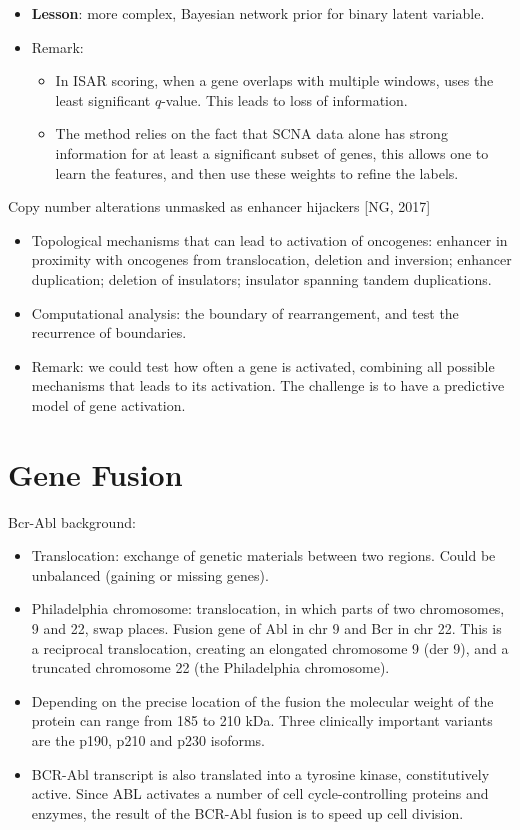 \documentclass{report}
\begin{document}
\begin{itemize}
	\item \textbf{Lesson}: more complex, Bayesian network prior for binary latent variable. 
	
	\item Remark: 
	\begin{itemize}
		\item In ISAR scoring, when a gene overlaps with multiple windows, uses the least significant $q$-value. This leads to loss of information. 
		\item The method relies on the fact that SCNA data alone has strong information for at least a significant subset of genes, this allows one to learn the features, and then use these weights to refine the labels. 
	\end{itemize}
\end{itemize}

Copy number alterations unmasked as enhancer hijackers [NG, 2017]
\begin{itemize}
	\item Topological mechanisms that can lead to activation of oncogenes: enhancer in proximity with oncogenes from translocation, deletion and inversion; enhancer duplication; deletion of insulators; insulator spanning tandem duplications. 
	
	\item Computational analysis: the boundary of rearrangement, and test the recurrence of boundaries. 
	
	\item Remark: we could test how often a gene is activated, combining all possible mechanisms that leads to its activation. The challenge is to have a predictive model of gene activation.  
\end{itemize}
\section{Gene Fusion}

Bcr-Abl background: 
\begin{itemize}
	\item Translocation: exchange of genetic materials between two regions. Could be unbalanced (gaining or missing genes). 
	\item Philadelphia chromosome:  translocation, in which parts of two chromosomes, 9 and 22, swap places. Fusion gene of Abl in chr 9 and Bcr in chr 22. This is a reciprocal translocation, creating an elongated chromosome 9 (der 9), and a truncated chromosome 22 (the Philadelphia chromosome). 
	
	\item Depending on the precise location of the fusion the molecular weight of the protein can range from 185 to 210 kDa. Three clinically important variants are the p190, p210 and p230 isoforms. 
	\item BCR-Abl transcript is also translated into a tyrosine kinase, constitutively active. Since ABL activates a number of cell cycle-controlling proteins and enzymes, the result of the BCR-Abl fusion is to speed up cell division.
\end{itemize}
\end{document}
